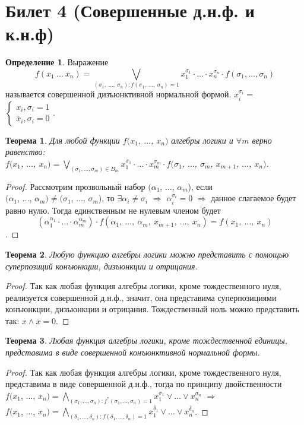 \documentclass[a4paper, 12pt]{article}
\theoremstyle{definition}
\newtheorem*{definition}{Определение}
\theoremstyle{plain}
\newtheorem*{theorem}{Теорема}
\theoremstyle{remark}
\begin{document}
  \section{Билет 4 (Совершенные д.н.ф. и к.н.ф)}
  \begin{definition}
    Выражение $$f(x_1 \ \ldots \ x_n)=\bigvee\limits_{(\sigma_1, \ \ldots, \ \sigma_n):f(\sigma_1, \ \ldots, \ \sigma_n)=1}x_1^{\sigma_1}\cdot\ldots\cdot x_n^{\sigma_n}\cdot f(\sigma_1,\ldots ,\sigma_n)$$ называется совершенной дизъюнктивной нормальной формой. $x_i^{\sigma_i}=$
    $\begin{cases}
      x_i,\sigma_i=1\\
      \overline{x}_i,\sigma_i=0
    \end{cases}$.
  \end{definition}
  \begin{theorem}
    Для любой функции $f(x_1$, $\ldots$, $x_n)$ алгебры логики и $\forall m$ верно равенство:\\
    $f(x_1$, $\ldots$, $x_n)=\bigvee\limits_{(\sigma_1, \ldots,\sigma_m)\in B_m}x_1^{\sigma_1}\cdot\ldots\cdot x_m^{\sigma_m}\cdot f(\sigma_1$, $\ldots$, $\sigma_m$, $x_{m+1}$, $\ldots$, $x_n)$.
  \end{theorem}
  \begin{proof}
    Рассмотрим прозвольный набор $(\alpha_1$, $\ldots$, $\alpha_m$), если\\ $(\alpha_1$, $\ldots$, $\alpha_m)\neq(\sigma_1$, $\ldots$, $\sigma_m$), то $\exists \alpha_i\neq\sigma_i$ $\Longrightarrow$ $\alpha_i^{\sigma_i}=0$ $\Longrightarrow$ данное слагаемое будет равно нулю. Тогда единственным не нулевым членом будет $$(\alpha_1^{\alpha_1}\cdot\ldots\cdot\alpha_m^{\alpha_m})\cdot f(\alpha_1, \ \ldots, \ \alpha_m, \ x_{m+1}, \ \ldots, \ x_n)=f(x_1, \ \ldots, \ x_n)$$.
  \end{proof}
  \begin{theorem}
    Любую функцию алгебры логики можно представить с помощью суперпозиций конъюнкции, дизъюнкции и отрицания.
  \end{theorem}
  \begin{proof}
    Так как любая функция алгебры логики, кроме тождественного нуля, реализуется совершенной д.н.ф., значит, она представима суперпозициями конъюнкции, дизъюнкции и отрицания. Тождественный ноль можно представить так: $x\wedge\overline{x}=0$.
  \end{proof}
  \begin{theorem}
    Любая функция алгебры логики, кроме тождественной единицы, представима в виде совершенной конъюнктивной нормальной формы.
  \end{theorem}
  \begin{proof}
    Так как любая функция алгебры логики, кроме тождественного нуля, представима в виде совершенной д.н.ф., тогда по принципу двойственности\\
    $f(x_1$, $\ldots$, $x_n)=\bigwedge\limits_{(\sigma_1, \ldots,\sigma_n):f^*(\sigma_1, \ldots,\sigma_n)=1}x_1^{\sigma_1}\vee\ldots\vee x_n^{\sigma_n}$ $\Longrightarrow$\\
    $f(x_1$, $\ldots$, $x_n)=\bigwedge\limits_{(\delta_1, \ldots,\delta_n):f(\delta_1, \ldots,\delta_n)=1}x_1^{\overline{\delta}_1}\vee\ldots\vee x_n^{\overline{\delta}_n}$.
  \end{proof}
\end{document}
